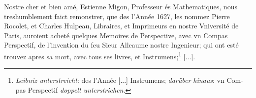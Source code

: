 \pend \newpage \pstart [p.~156] Nostre cher et bien am\'{e}, Estienne Migon\protect{}, Professeur \'{e}s Mathematiques, nous tres\textendash humblement faict remonstrer, que des l'Ann\'{e}e 1627, les nommez Pierre Rocolet\protect{}, et Charles Hulpeau, Libraires, et Imprimeurs en nostre Vniversit\'{e} de Paris\protect{}, auroient achet\'{e} quelques Memoires de Perspective\protect{}, avec vn Compas Perspectif\protect{}, de l'invention du feu Sieur Alleaume\protect{} nostre Ingenieur; qui ont est\'{e} trouvez apres sa mort, avec tous ses livres, et Instrumens;\footnote{\textit{Leibniz unterstreicht}: des l'Ann\'{e}e [...] Instrumens; \textit{dar\"{u}ber hinaus}: vn Com{-}pas Perspectif \textit{\textit{doppelt unterstrichen}}.} [...]. \pend 